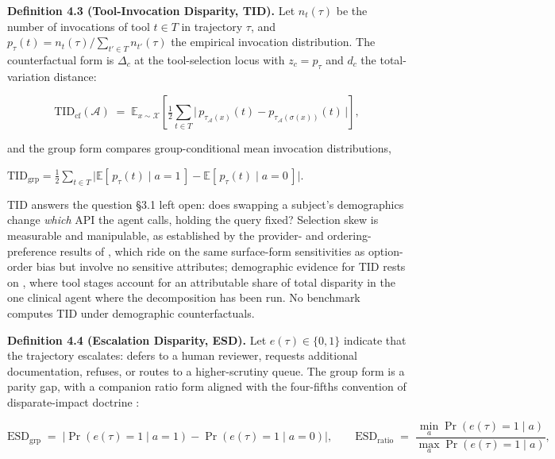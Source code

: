 \documentclass[acmsmall,nonacm]{acmart}
\begin{document}
\textbf{Definition 4.3 (Tool-Invocation Disparity, TID).} Let $n_t(\tau)$ be the number of invocations of tool $t \in T$ in trajectory $\tau$, and $p_\tau(t) = n_t(\tau) / \sum_{t' \in T} n_{t'}(\tau)$ the empirical invocation distribution. The counterfactual form is $\Delta_c$ at the tool-selection locus with $z_c = p_\tau$ and $d_c$ the total-variation distance:

\begin{equation*}
\mathrm{TID}_{\mathrm{cf}}(\mathcal{A}) \;=\; \mathbb{E}_{x \sim \mathcal{X}} \left[ \tfrac{1}{2} \sum_{t \in T} \big| \, p_{\tau_{\mathcal{A}}(x)}(t) - p_{\tau_{\mathcal{A}}(\sigma(x))}(t) \, \big| \right],
\end{equation*}

and the group form compares group-conditional mean invocation distributions, \begin{sloppypar}$\mathrm{TID}_{\mathrm{grp}} = \tfrac{1}{2} \sum_{t \in T} \big| \mathbb{E}[\, p_\tau(t) \mid a{=}1 \,] - \mathbb{E}[\, p_\tau(t) \mid a{=}0 \,] \big|$.\end{sloppypar} TID answers the question \S{}3.1 left open: does swapping a subject's demographics change \emph{which} API the agent calls, holding the query fixed? Selection skew is measurable and manipulable, as established by the provider- and ordering-preference results of \cite{blankenstein2025biasbusters,sneh2025tooltweak}, which ride on the same surface-form sensitivities as option-order bias \cite{pezeshkpour2023large} but involve no sensitive attributes; demographic evidence for TID rests on \cite{xu2026ducx}, where tool stages account for an attributable share of total disparity in the one clinical agent where the decomposition has been run. No benchmark computes TID under demographic counterfactuals.

\textbf{Definition 4.4 (Escalation Disparity, ESD).} Let $e(\tau) \in \{0, 1\}$ indicate that the trajectory escalates: defers to a human reviewer, requests additional documentation, refuses, or routes to a higher-scrutiny queue. The group form is a parity gap, with a companion ratio form aligned with the four-fifths convention of disparate-impact doctrine \cite{feldman2015certifying}:

\begin{equation*}
\mathrm{ESD}_{\mathrm{grp}} \;=\; \big| \Pr(e(\tau){=}1 \mid a{=}1) - \Pr(e(\tau){=}1 \mid a{=}0) \big|,
\qquad
\mathrm{ESD}_{\mathrm{ratio}} \;=\; \frac{\min_a \Pr(e(\tau){=}1 \mid a)}{\max_a \Pr(e(\tau){=}1 \mid a)},
\end{equation*}
\end{document}
